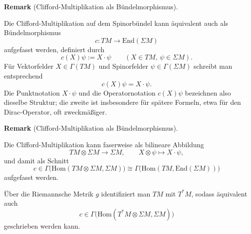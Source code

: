 \documentclass[10pt, letterpaper]{article}
\newcommand{\End}{\mathrm{End}}
\newcommand{\Hom}{\mathrm{Hom}}
\newcommand{\CustomHeading}[3]{%
  \par\medskip\noindent%
  \textbf{#1 #2} \textnormal{(#3)}.\enskip%
}
\newenvironment{REM}[2]{\CustomHeading{Remark}{#1}{#2}}{}
\begin{document}
\begin{REM}{}{Clifford-Multiplikation als Bündelmorphismus}
Die Clifford-Multiplikation auf dem Spinorbündel kann äquivalent auch als
Bündelmorphismus
\[
c:TM\to \End(\Sigma M)
\]
aufgefasst werden, definiert durch
\[
c(X)\psi:=X\cdot \psi
\qquad (X\in TM,\ \psi\in \Sigma M).
\]
Für Vektorfelder \(X\in \Gamma(TM)\) und Spinorfelder \(\psi\in \Gamma(\Sigma M)\)
schreibt man entsprechend
\[
c(X)\psi = X\cdot \psi .
\]
Die Punktnotation \(X\cdot \psi\) und die Operatornotation \(c(X)\psi\) bezeichnen
also dieselbe Struktur; die zweite ist insbesondere für spätere Formeln, etwa
für den Dirac-Operator, oft zweckmäßiger.
\end{REM}

\begin{REM}{}{Clifford-Multiplikation als Bündelmorphismus}
Die Clifford-Multiplikation kann faserweise als bilineare Abbildung
\[
TM\otimes \Sigma M \to \Sigma M,\qquad X\otimes \psi \mapsto X\cdot \psi,
\]
und damit als Schnitt
\[
c\in \Gamma\!\bigl(\Hom(TM\otimes \Sigma M,\Sigma M)\bigr)
\cong \Gamma\!\bigl(\Hom(TM,\End(\Sigma M))\bigr)
\]
aufgefasst werden.

Über die Riemannsche Metrik $g$ identifiziert man $TM$ mit $T^*M$, sodass äquivalent auch
\[
c\in \Gamma\!\bigl(\Hom(T^*M\otimes \Sigma M,\Sigma M)\bigr)
\]
geschrieben werden kann.
\end{REM}
\end{document}
